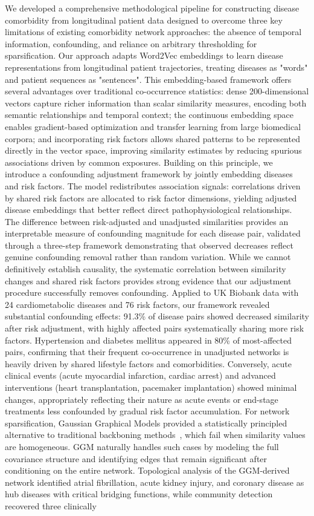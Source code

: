 We developed a comprehensive methodological pipeline for constructing disease comorbidity from longitudinal patient data designed to overcome three key limitations of existing comorbidity network approaches: the absence of temporal information, confounding, and reliance on arbitrary thresholding for sparsification. Our approach adapts Word2Vec embeddings to learn disease representations from longitudinal patient trajectories, treating diseases as "words" and patient sequences as "sentences". This embedding-based framework offers several advantages over traditional co-occurrence statistics: dense 200-dimensional vectors capture richer information than scalar similarity measures, encoding both semantic relationships and temporal context; the continuous embedding space enables gradient-based optimization and transfer learning from large biomedical corpora; and incorporating risk factors allows shared patterns to be represented directly in the vector space, improving similarity estimates by reducing spurious associations driven by common exposures. Building on this principle, we introduce a confounding adjustment framework by jointly embedding diseases and risk factors. The model redistributes association signals: correlations driven by shared risk factors are allocated to risk factor dimensions, yielding adjusted disease embeddings that better reflect direct pathophysiological relationships. The difference between risk-adjusted and unadjusted similarities provides an interpretable measure of confounding magnitude for each disease pair, validated through a three-step framework demonstrating that observed decreases reflect genuine confounding removal rather than random variation. While we cannot definitively establish causality, the systematic correlation between similarity changes and shared risk factors provides strong evidence that our adjustment procedure successfully removes confounding. Applied to UK Biobank data with 24 cardiometabolic diseases and 76 risk factors, our framework revealed substantial confounding effects: 91.3\% of disease pairs showed decreased similarity after risk adjustment, with highly affected pairs systematically sharing more risk factors. Hypertension and diabetes mellitus appeared in 80\% of most-affected pairs, confirming that their frequent co-occurrence in unadjusted networks is heavily driven by shared lifestyle factors and comorbidities. Conversely, acute clinical events (acute myocardial infarction, cardiac arrest) and advanced interventions (heart transplantation, pacemaker implantation) showed minimal changes, appropriately reflecting their nature as acute events or end-stage treatments less confounded by gradual risk factor accumulation. For network sparsification, Gaussian Graphical Models provided a statistically principled alternative to traditional backboning methods~\cite{serrano2009extracting}, which fail when similarity values are homogeneous. GGM naturally handles such cases by modeling the full covariance structure and identifying edges that remain significant after conditioning on the entire network. Topological analysis of the GGM-derived network identified atrial fibrillation, acute kidney injury, and coronary disease as hub diseases with critical bridging functions, while community detection recovered three clinically 